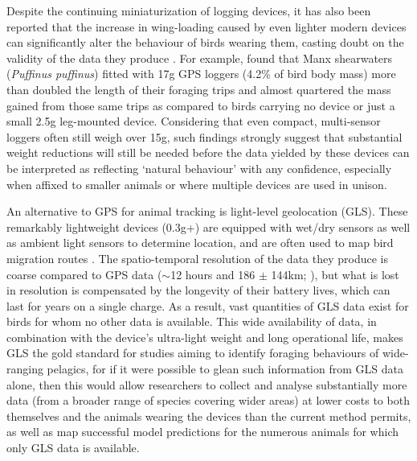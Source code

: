 \documentclass[11pt]{article}
\begin{document}
    Despite the continuing miniaturization of logging devices, it has also been reported that the increase in wing-loading caused by even lighter modern devices can significantly alter the behaviour of birds wearing them, casting doubt on the validity of the data they produce \citep{barron2010meta,phillips2003effects,calvo1992review,jackson2002potential}. For example, \cite{gillies2020short} found that Manx shearwaters (\emph{Puffinus puffinus}) fitted with 17g GPS loggers (4.2\% of bird body mass) more than doubled the length of their foraging trips and almost quartered the mass gained from those same trips as compared to birds carrying no device or just a small 2.5g leg-mounted device. Considering that even compact, multi-sensor loggers often still weigh over 15g, such findings strongly suggest that substantial weight reductions will still be needed before the data yielded by these devices can be interpreted as reflecting ‘natural behaviour’ with any confidence, especially when affixed to smaller animals or where multiple devices are used in unison.
    
    An alternative to GPS for animal tracking is light-level geolocation (GLS). These remarkably lightweight devices (0.3g+) are equipped with wet/dry sensors as well as ambient light sensors to determine location, and are often used to map bird migration routes \citep{newton2010migration,aakesson2012migration,minton2010initial,bachler2010year,jahn2013long}. 
    The spatio-temporal resolution of the data they produce is coarse compared to GPS data ($\sim$12 hours and 186 $\pm$ 144km; \cite{phillips2004accuracy}), but what is lost in resolution is compensated by the longevity of their battery lives, which can last for years on a single charge. As a result, vast quantities of GLS data exist for birds for whom no other data is available. This wide availability of data, in combination with the device's ultra-light weight and long operational life, makes GLS the gold standard for studies aiming to identify foraging behaviours of wide-ranging pelagics, for if it were possible to glean such information from GLS data alone, then this would allow researchers to collect and analyse substantially more data (from a broader range of species covering wider areas) at lower costs to both themselves and the animals wearing the devices than the current method permits, as well as map successful model predictions for the numerous animals for which only GLS data is available.
    
\end{document}
